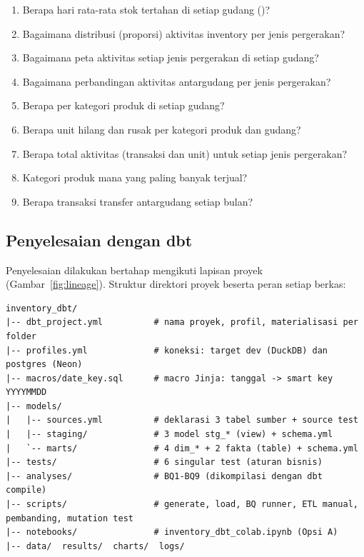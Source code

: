 \begin{enumerate}[label=\textbf{BQ\arabic*}, leftmargin=3em, nosep]
    \item Berapa hari rata-rata stok tertahan di setiap gudang ()?
    \item Bagaimana distribusi (proporsi) aktivitas inventory per jenis pergerakan?
    \item Bagaimana peta aktivitas setiap jenis pergerakan di setiap gudang?
    \item Bagaimana perbandingan aktivitas antargudang per jenis pergerakan?
    \item Berapa  per kategori produk di setiap gudang?
    \item Berapa unit hilang dan rusak per kategori produk dan gudang?
    \item Berapa total aktivitas (transaksi dan unit) untuk setiap jenis pergerakan?
    \item Kategori produk mana yang paling banyak terjual?
    \item Berapa transaksi transfer antargudang setiap bulan?
\end{enumerate}

\subsection{Penyelesaian dengan dbt}\label{sec:penyelesaian}
Penyelesaian dilakukan bertahap mengikuti lapisan proyek (Gambar~\ref{fig:lineage}). Struktur direktori proyek beserta peran setiap berkas:

\begin{lstlisting}[language={}, caption={Struktur direktori proyek \kode{inventory\_dbt}.}, label={lst:struktur}]
inventory_dbt/
|-- dbt_project.yml          # nama proyek, profil, materialisasi per folder
|-- profiles.yml             # koneksi: target dev (DuckDB) dan postgres (Neon)
|-- macros/date_key.sql      # macro Jinja: tanggal -> smart key YYYYMMDD
|-- models/
|   |-- sources.yml          # deklarasi 3 tabel sumber + source test
|   |-- staging/             # 3 model stg_* (view) + schema.yml
|   `-- marts/               # 4 dim_* + 2 fakta (table) + schema.yml
|-- tests/                   # 6 singular test (aturan bisnis)
|-- analyses/                # BQ1-BQ9 (dikompilasi dengan dbt compile)
|-- scripts/                 # generate, load, BQ runner, ETL manual, pembanding, mutation test
|-- notebooks/               # inventory_dbt_colab.ipynb (Opsi A)
|-- data/  results/  charts/  logs/
\end{lstlisting}

